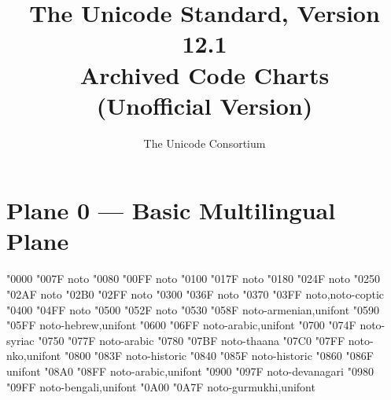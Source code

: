 \documentclass{article}
\title{The Unicode Standard, Version 12.1\\
  Archived Code Charts\\
  (Unofficial Version)}
\author{The Unicode Consortium}
\begin{document}
\maketitle
\tableofcontents

\section{Plane 0 --- Basic Multilingual Plane}

                    {  "0000} {  "007F} {noto}
             {  "0080} {  "00FF} {noto}
                               {  "0100} {  "017F} {noto}
                               {  "0180} {  "024F} {noto}
                                 {  "0250} {  "02AF} {noto}
                       {  "02B0} {  "02FF} {noto}
                    {  "0300} {  "036F} {noto}
                               {  "0370} {  "03FF} {noto,noto-coptic}
                                       {  "0400} {  "04FF} {noto}
                            {  "0500} {  "052F} {noto}
                                       {  "0530} {  "058F} {noto-armenian,unifont}
                                         {  "0590} {  "05FF} {noto-hebrew,unifont}
                                         {  "0600} {  "06FF} {noto-arabic,unifont}
                                         {  "0700} {  "074F} {noto-syriac}
                              {  "0750} {  "077F} {noto-arabic}
                                         {  "0780} {  "07BF} {noto-thaana}
                                            {  "07C0} {  "07FF} {noto-nko,unifont}
                                      {  "0800} {  "083F} {noto-historic}
                                        {  "0840} {  "085F} {noto-historic}
                              {  "0860} {  "086F} {unifont}
                              {  "08A0} {  "08FF} {noto-arabic,unifont}
                                     {  "0900} {  "097F} {noto-devanagari}
                                        {  "0980} {  "09FF} {noto-bengali,unifont}
                                       {  "0A00} {  "0A7F} {noto-gurmukhi,unifont}
\end{document}
